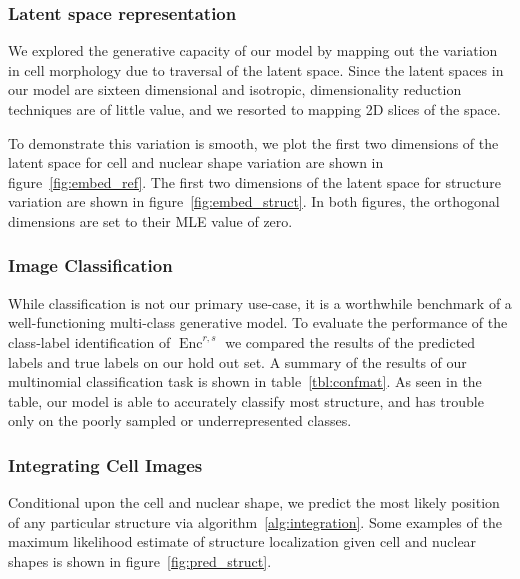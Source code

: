 \documentclass[accepted]{article}
\DeclareMathOperator{\Enc}{Enc}
\begin{document}
\subsubsection{Latent space representation}

We explored the generative capacity of our model by mapping out the variation in cell morphology due to traversal of the latent space.
Since the latent spaces in our model are sixteen dimensional and isotropic, dimensionality reduction techniques are of little value, and we resorted to mapping 2D slices of the space.

To demonstrate this variation is smooth, we plot the first two dimensions of the latent space for cell and nuclear shape variation are shown in figure~\ref{fig:embed_ref}.
The first two dimensions of the latent space for structure variation are shown in figure~\ref{fig:embed_struct}.
In both figures, the orthogonal dimensions are set to their MLE value of zero.

\subsubsection{Image Classification}

While classification is not our primary use-case, it is a worthwhile benchmark of a well-functioning multi-class generative model.
To evaluate the performance of the class-label identification of $\Enc^{r,s}$ we compared the results of the predicted labels and true labels on our hold out set.
A summary of the results of our multinomial classification task is shown in table~\ref{tbl:confmat}.
As seen in the table, our model is able to accurately classify most structure, and has trouble only on the poorly sampled or underrepresented classes.

\subsubsection{Integrating Cell Images}

Conditional upon the cell and nuclear shape, we predict the most likely position of any particular structure via algorithm~\ref{alg:integration}.
Some examples of the maximum likelihood estimate of structure localization given cell and nuclear shapes is shown in figure~\ref{fig:pred_struct}.
\end{document}
